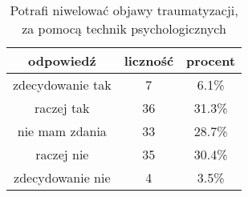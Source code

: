 \begin{table}[H]
\caption{Potrafi niwelować objawy traumatyzacji, za pomocą technik psychologicznych}
\centering
\begin{tabular}{ | c | c | c |}
\hline
odpowiedź & liczność & procent\\
\hline
zdecydowanie tak  &  7  & 6.1\% \\
\hline
raczej tak  &  36  & 31.3\% \\
\hline
nie mam zdania  &  33  & 28.7\% \\
\hline
raczej nie  &  35  & 30.4\% \\
\hline
zdecydowanie nie  &  4  & 3.5\% \\
\hline
\end{tabular}
\label{tab:Q12}
\end{table}
